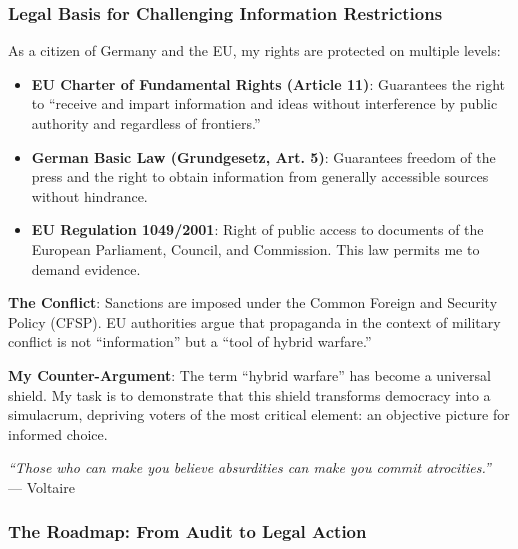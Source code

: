\documentclass[11pt,a4paper]{article}
\theoremstyle{definition}
\theoremstyle{remark}
\begin{document}
\hrulefill

\subsubsection*{Legal Basis for Challenging Information Restrictions}

As a citizen of Germany and the EU, my rights are protected on multiple levels:

\begin{itemize}
\item \textbf{EU Charter of Fundamental Rights (Article 11)}: Guarantees the right to ``receive and impart information and ideas without interference by public authority and regardless of frontiers.''
\item \textbf{German Basic Law (Grundgesetz, Art. 5)}: Guarantees freedom of the press and the right to obtain information from generally accessible sources without hindrance.
\item \textbf{EU Regulation 1049/2001}: Right of public access to documents of the European Parliament, Council, and Commission. This law permits me to demand evidence.
\end{itemize}

\textbf{The Conflict}: Sanctions are imposed under the Common Foreign and Security Policy (CFSP). EU authorities argue that propaganda in the context of military conflict is not ``information'' but a ``tool of hybrid warfare.''

\textbf{My Counter-Argument}: The term ``hybrid warfare'' has become a universal shield. My task is to demonstrate that this shield transforms democracy into a simulacrum, depriving voters of the most critical element: an objective picture for informed choice.

\begin{center}
\textit{``Those who can make you believe absurdities can make you commit atrocities.''} \\
--- Voltaire
\end{center}

\hrulefill

\subsubsection*{The Roadmap: From Audit to Legal Action}
\end{document}

